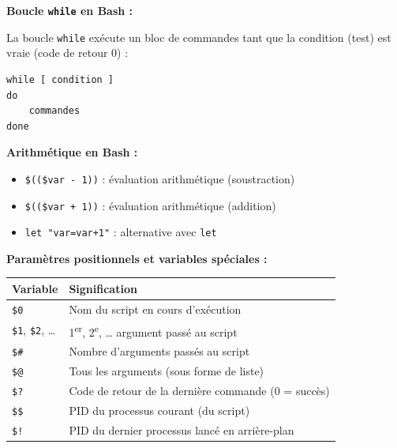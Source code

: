 \documentclass[a4paper,11pt]{article}
\theoremstyle{plain}
\theoremstyle{definition}
\begin{document}
\begin{rappel}
\textbf{Boucle \texttt{while} en Bash :}

La boucle \texttt{while} exécute un bloc de commandes tant que la condition (test) est vraie (code de retour 0) :
\begin{lstlisting}[numbers=none]
while [ condition ]
do
    commandes
done
\end{lstlisting}

\medskip
\textbf{Arithmétique en Bash :}
\begin{itemize}
    \item \texttt{\$((\$var - 1))} : évaluation arithmétique (soustraction)
    \item \texttt{\$((\$var + 1))} : évaluation arithmétique (addition)
    \item \texttt{let "var=var+1"} : alternative avec \texttt{let}
\end{itemize}

\medskip
\textbf{Paramètres positionnels et variables spéciales :}

\begin{center}
\begin{tabular}{ll}
\toprule
\textbf{Variable} & \textbf{Signification} \\
\midrule
\texttt{\$0} & Nom du script en cours d'exécution \\
\texttt{\$1}, \texttt{\$2}, \ldots & 1\textsuperscript{er}, 2\textsuperscript{e}, \ldots{} argument passé au script \\
\texttt{\$\#} & Nombre d'arguments passés au script \\
\texttt{\$@} & Tous les arguments (sous forme de liste) \\
\texttt{\$?} & Code de retour de la dernière commande (0 = succès) \\
\texttt{\$\$} & PID du processus courant (du script) \\
\texttt{\$!} & PID du dernier processus lancé en arrière-plan \\
\bottomrule
\end{tabular}
\end{center}
\end{rappel}
\end{document}
